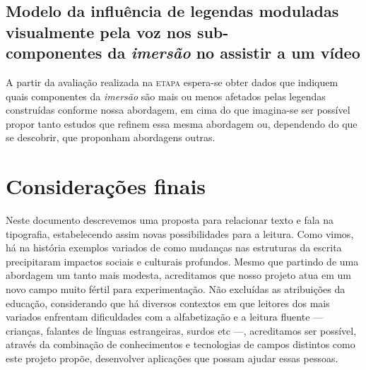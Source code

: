 \documentclass[a4paper,11pt,titlepage,singlespacing]{article}
\newcommand{\etapa}[1]{\textsc{etapa \oldstylenums{#1}}}
\begin{document}
    \subsection{Modelo da influência de legendas moduladas visualmente pela voz nos sub-\\componentes da \textit{imersão} no assistir a um vídeo}
    
    A partir da avaliação realizada na \etapa{4} espera-se obter dados que indiquem quais componentes da \textit{imersão} são mais ou menos afetados pelas legendas construídas conforme nossa abordagem, em cima do que imagina-se ser possível propor tanto estudos que refinem essa mesma abordagem ou, dependendo do que se descobrir, que proponham abordagens outras.
    
    
    
\newpage

\section{Considerações finais}
\label{sec:consideracoes_finais}

Neste documento descrevemos uma proposta para relacionar texto e fala na tipografia, estabelecendo assim novas possibilidades para a leitura. Como vimos, há na história exemplos variados de como mudanças nas estruturas da escrita precipitaram impactos sociais e culturais profundos. Mesmo que partindo de uma abordagem um tanto mais modesta, acreditamos que nosso projeto atua em um novo campo muito fértil para experimentação. Não excluídas as atribuições da educação, considerando que há diversos contextos em que leitores dos mais variados enfrentam dificuldades com a alfabetização e a leitura fluente — crianças, falantes de línguas estrangeiras, surdos etc —, acreditamos ser possível,  através da combinação de conhecimentos e tecnologias de campos distintos como este projeto propõe, desenvolver aplicações que possam ajudar essas pessoas.
\end{document}
